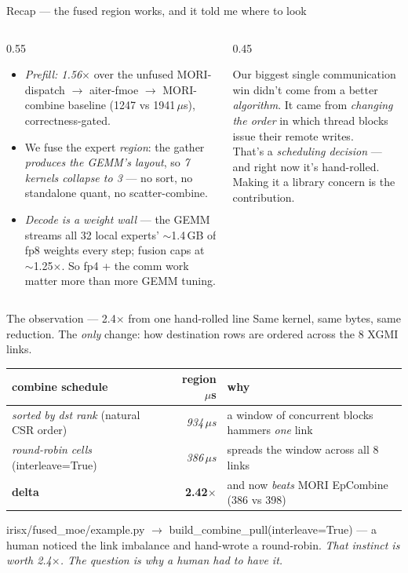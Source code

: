 \documentclass[pdf,aspectratio=169]{beamer}
\newcommand{\empy}[1]{{\color{darkorange}\emph{#1}}}
\newcommand{\empr}[1]{{\color{cardinalred}\emph{#1}}}
\newcommand{\examplebox}[2]{%
\begin{tcolorbox}[colframe=darkcardinal,colback=boxgray,title={#1}]
#2
\end{tcolorbox}}
\newcommand{\mc}[1]{{\ttfamily\small #1}}
\begin{document}
\begin{frame}{Recap --- the fused region works, and it told me where to look}
\begin{columns}
\begin{column}{0.55\textwidth}
\footnotesize
\begin{itemize}\footnotesize
  \item \empr{Prefill: 1.56$\times$} over the unfused MORI-dispatch $\to$ aiter-fmoe $\to$ MORI-combine baseline (1247 vs 1941\,$\mu$s), correctness-gated.
  \item We fuse the expert \emph{region}: the gather \empy{produces the GEMM's layout}, so \empy{7 kernels collapse to 3} --- no sort, no standalone quant, no scatter-combine.
  \item \empr{Decode is a weight wall} --- the GEMM streams all 32 local experts' $\sim$1.4\,GB of fp8 weights every step; fusion caps at $\sim$1.25$\times$. So fp4 + the comm work matter more than more GEMM tuning.
\end{itemize}
\end{column}
\begin{column}{0.45\textwidth}
\examplebox{The thread I'm pulling on}{\footnotesize
Our biggest single communication win didn't come from a better \emph{algorithm}. It came from \empr{changing the order} in which thread blocks issue their remote writes.
\vspace{1ex}\\
That's a \empy{scheduling decision} --- and right now it's hand-rolled. Making it a library concern is the contribution.}
\end{column}
\end{columns}
\end{frame}

\begin{frame}{The observation --- 2.4$\times$ from one hand-rolled line}
\footnotesize
Same kernel, same bytes, same reduction. The \emph{only} change: how destination rows are ordered across the 8 XGMI links.
\begin{center}
\begin{tabular}{lrl}
\toprule
combine schedule & region $\mu$s & why \\
\midrule
\empr{sorted by dst rank} (natural CSR order) & \empr{934\,$\mu$s} & a window of concurrent blocks hammers \emph{one} link \\
\empy{round-robin cells} (\mc{interleave=True}) & \empy{386\,$\mu$s} & spreads the window across all 8 links \\
\midrule
\textbf{delta} & \textbf{2.42$\times$} & and now \emph{beats} MORI EpCombine (386 vs 398) \\
\bottomrule
\end{tabular}
\end{center}
\examplebox{The hook}{\footnotesize
\mc{irisx/fused\_moe/example.py $\to$ build\_combine\_pull(interleave=True)} --- a human noticed the link imbalance and hand-wrote a round-robin. \empr{That instinct is worth 2.4$\times$. The question is why a human had to have it.}}
\end{frame}
\end{document}
